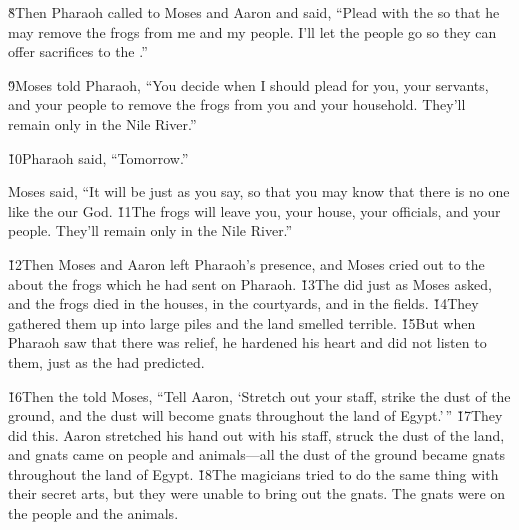\v{8}Then Pharaoh called to Moses and Aaron and said, ``Plead with the  so that he may remove the frogs from me and my people. I'll let the people go so they can offer sacrifices to the .''

\v{9}Moses told Pharaoh, ``You decide when I should plead for you, your servants, and your people to remove the frogs from you and your household. They'll remain only in the Nile River.''

\v{10}Pharaoh said, ``Tomorrow.''

Moses said, ``It will be just as you say, so that you may know that there is no one like the  our God. \v{11}The frogs will leave you, your house, your officials, and your people. They'll remain only in the Nile River.''

\v{12}Then Moses and Aaron left Pharaoh's presence, and Moses cried out to the  about the frogs which he had sent on Pharaoh. \v{13}The  did just as Moses asked, and the frogs died in the houses, in the courtyards, and in the fields. \v{14}They gathered them up into large piles and the land smelled terrible. \v{15}But when Pharaoh saw that there was relief, he hardened his heart and did not listen to them, just as the  had predicted.

\v{16}Then the  told Moses, ``Tell Aaron, `Stretch out your staff, strike the dust of the ground, and the dust will become gnats throughout the land of Egypt.'\,'' \v{17}They did this. Aaron stretched his hand out with his staff, struck the dust of the land, and gnats came on people and animals---all the dust of the ground became gnats throughout the land of Egypt. \v{18}The magicians tried to do the same thing with their secret arts, but they were unable to bring out the gnats. The gnats were on the people and the animals.

